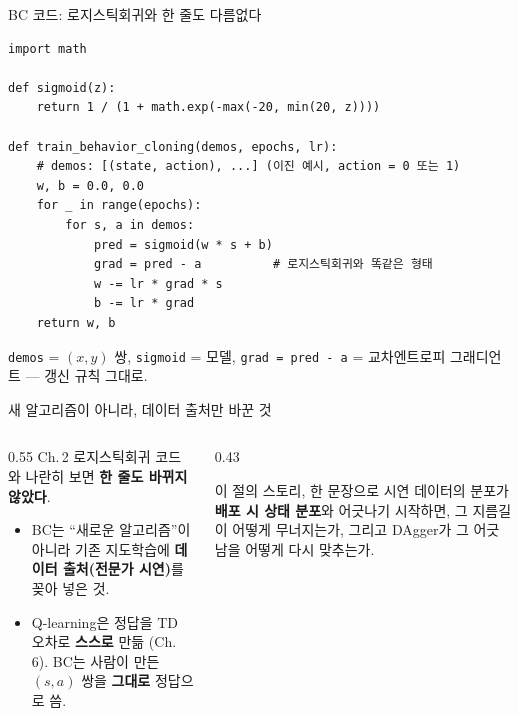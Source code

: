 \documentclass[aspectratio=169,11pt]{beamer}
\begin{document}
\begin{frame}[fragile]{BC 코드: 로지스틱회귀와 한 줄도 다름없다}
  \begin{lstlisting}
import math

def sigmoid(z):
    return 1 / (1 + math.exp(-max(-20, min(20, z))))

def train_behavior_cloning(demos, epochs, lr):
    # demos: [(state, action), ...] (이진 예시, action = 0 또는 1)
    w, b = 0.0, 0.0
    for _ in range(epochs):
        for s, a in demos:
            pred = sigmoid(w * s + b)
            grad = pred - a          # 로지스틱회귀와 똑같은 형태
            w -= lr * grad * s
            b -= lr * grad
    return w, b
  \end{lstlisting}
  {\footnotesize \texttt{demos} = $(x,y)$ 쌍, \texttt{sigmoid} = 모델,
  \texttt{grad = pred - a} = 교차엔트로피 그래디언트 — 갱신 규칙 그대로.
  }
\end{frame}

\begin{frame}{새 알고리즘이 아니라, 데이터 출처만 바꾼 것}
  \begin{columns}[T]
    \begin{column}{0.55\textwidth}
      Ch.\,2 로지스틱회귀 코드와 나란히 보면 \textbf{한 줄도
      바뀌지 않았다}.
      \begin{itemize}
        \item BC는 ``새로운 알고리즘''이 아니라 기존 지도학습에
          \textbf{데이터 출처(전문가 시연)}를 꽂아 넣은 것.
        \item Q-learning은 정답을 TD 오차로 \textbf{스스로} 만듦
          (Ch.\,6). BC는 사람이 만든 $(s,a)$ 쌍을 \textbf{그대로}
          정답으로 씀.
      \end{itemize}
    \end{column}
    \begin{column}{0.43\textwidth}
      \begin{block}{이 절의 스토리, 한 문장으로}
        시연 데이터의 분포가 \textbf{배포 시 상태 분포}와 어긋나기
        시작하면, 그 지름길이 어떻게 무너지는가, 그리고 DAgger가
        그 어긋남을 어떻게 다시 맞추는가.
      \end{block}
    \end{column}
  \end{columns}
\end{frame}
\end{document}

